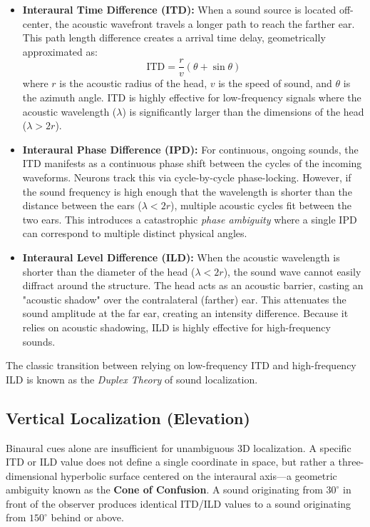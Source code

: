 \begin{itemize}
    \item \textbf{Interaural Time Difference (ITD):} When a sound source is located off-center, the acoustic wavefront travels a longer path to reach the farther ear. This path length difference creates a arrival time delay, geometrically approximated as:
    \begin{equation}
        \text{ITD} = \frac{r}{v}(\theta + \sin\theta)
    \end{equation}
    where $r$ is the acoustic radius of the head, $v$ is the speed of sound, and $\theta$ is the azimuth angle. ITD is highly effective for low-frequency signals where the acoustic wavelength ($\lambda$) is significantly larger than the dimensions of the head ($\lambda > 2r$).
    
    \item \textbf{Interaural Phase Difference (IPD):} For continuous, ongoing sounds, the ITD manifests as a continuous phase shift between the cycles of the incoming waveforms. Neurons track this via cycle-by-cycle phase-locking. However, if the sound frequency is high enough that the wavelength is shorter than the distance between the ears ($\lambda < 2r$), multiple acoustic cycles fit between the two ears. This introduces a catastrophic \textit{phase ambiguity} where a single IPD can correspond to multiple distinct physical angles.
    
    \item \textbf{Interaural Level Difference (ILD):} When the acoustic wavelength is shorter than the diameter of the head ($\lambda < 2r$), the sound wave cannot easily diffract around the structure. The head acts as an acoustic barrier, casting an "acoustic shadow" over the contralateral (farther) ear. This attenuates the sound amplitude at the far ear, creating an intensity difference. Because it relies on acoustic shadowing, ILD is highly effective for high-frequency sounds.
\end{itemize}

The classic transition between relying on low-frequency ITD and high-frequency ILD is known as the \textit{Duplex Theory} of sound localization. 

\subsection{Vertical Localization (Elevation)}
Binaural cues alone are insufficient for unambiguous 3D localization. A specific ITD or ILD value does not define a single coordinate in space, but rather a three-dimensional hyperbolic surface centered on the interaural axis—a geometric ambiguity known as the \textbf{Cone of Confusion}. A sound originating from $30^{\circ}$ in front of the observer produces identical ITD/ILD values to a sound originating from $150^{\circ}$ behind or above.

